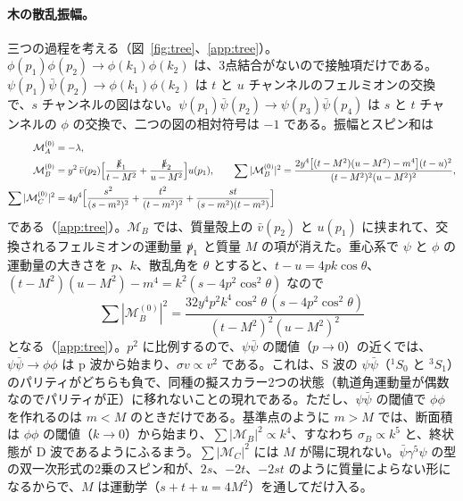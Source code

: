 \documentclass[a4paper,10pt]{ltjsarticle}
\begin{document}
\paragraph{木の散乱振幅。}三つの過程を考える（図~\ref{fig:tree}、\ref{app:tree}）。$\phi(p_1)\phi(p_2)\to\phi(k_1)\phi(k_2)$ は、3点結合がないので接触項だけである。$\psi(p_1)\bar\psi(p_2)\to\phi(k_1)\phi(k_2)$ は $t$ と $u$ チャンネルのフェルミオンの交換で、$s$ チャンネルの図はない。$\psi(p_1)\bar\psi(p_2)\to\psi(p_3)\bar\psi(p_4)$ は $s$ と $t$ チャンネルの $\phi$ の交換で、二つの図の相対符号は $-1$ である。振幅とスピン和は
\begin{equation}
\begin{aligned}
\mathcal M_A^{(0)}&=-\lambda,\\
\mathcal M_B^{(0)}&=y^2\,\bar v(p_2)\Bigl[\frac{\slashed k_1}{t-M^2}+\frac{\slashed k_2}{u-M^2}\Bigr]u(p_1),\qquad
\sum|\mathcal M_B^{(0)}|^2=\frac{2y^4\bigl[(t-M^2)(u-M^2)-m^4\bigr](t-u)^2}{(t-M^2)^2(u-M^2)^2},\\
\sum|\mathcal M_C^{(0)}|^2&=4y^4\Bigl[\frac{s^2}{(s-m^2)^2}+\frac{t^2}{(t-m^2)^2}+\frac{st}{(s-m^2)(t-m^2)}\Bigr]
\end{aligned}
\label{eq:Mtree}
\end{equation}
である（\ref{app:tree}）。$\mathcal{M}_B$ では、質量殻上の $\bar v(p_2)$ と $u(p_1)$ に挟まれて、交換されるフェルミオンの運動量 $\slashed p_1$ と質量 $M$ の項が消えた。重心系で $\psi$ と $\phi$ の運動量の大きさを $p$、$k$、散乱角を $\theta$ とすると、$t-u=4pk\cos\theta$、$(t-M^2)(u-M^2)-m^4=k^2(s-4p^2\cos^2\theta)$ なので
\begin{equation*}
\sum|\mathcal M_B^{(0)}|^2=\frac{32y^4p^2k^4\cos^2\theta\,(s-4p^2\cos^2\theta)}{(t-M^2)^2(u-M^2)^2}
\end{equation*}
となる（\ref{app:tree}）。$p^2$ に比例するので、$\psi\bar\psi$ の閾値（$p\to0$）の近くでは、$\psi\bar\psi\to\phi\phi$ は p 波から始まり、$\sigma v\propto v^2$ である。これは、S 波の $\psi\bar\psi$（${}^1S_0$ と ${}^3S_1$）のパリティがどちらも負で、同種の擬スカラー2つの状態（軌道角運動量が偶数なのでパリティが正）に移れないことの現れである。ただし、$\psi\bar\psi$ の閾値で $\phi\phi$ を作れるのは $m<M$ のときだけである。基準点のように $m>M$ では、断面積は $\phi\phi$ の閾値（$k\to0$）から始まり、$\sum|\mathcal M_B|^2\propto k^4$、すなわち $\sigma_B\propto k^5$ と、終状態が D 波であるようにふるまう。$\sum|\mathcal M_C|^2$ には $M$ が陽に現れない。$\bar\psi\gamma^5\psi$ の型の双一次形式の2乗のスピン和が、$2s$、$-2t$、$-2st$ のように質量によらない形になるからで、$M$ は運動学（$s+t+u=4M^2$）を通してだけ入る。
\end{document}
